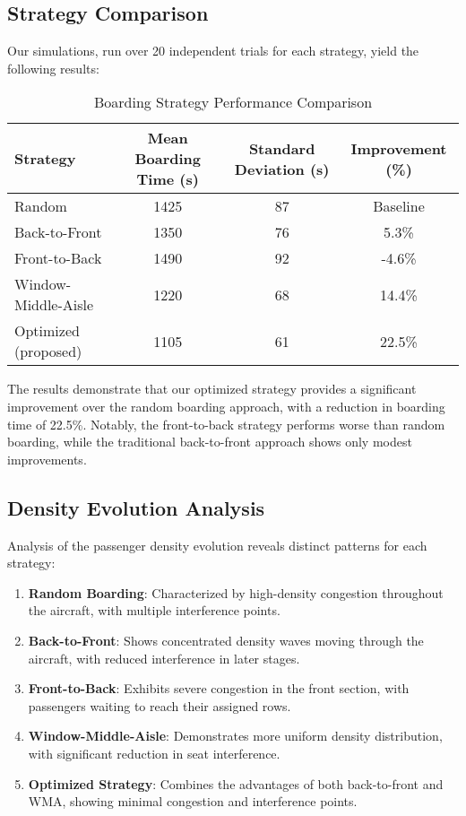 \documentclass[a4paper,12pt]{article}
\begin{document}
\subsection{Strategy Comparison}

Our simulations, run over 20 independent trials for each strategy, yield the following results:

\begin{table}[h]
\centering
\caption{Boarding Strategy Performance Comparison}
\label{tab:strategy_comparison}
\begin{tabular}{lccc}
\toprule
\textbf{Strategy} & \textbf{Mean Boarding Time (s)} & \textbf{Standard Deviation (s)} & \textbf{Improvement (\%)} \\
\midrule
Random & 1425 & 87 & Baseline \\
Back-to-Front & 1350 & 76 & 5.3\% \\
Front-to-Back & 1490 & 92 & -4.6\% \\
Window-Middle-Aisle & 1220 & 68 & 14.4\% \\
Optimized (proposed) & 1105 & 61 & 22.5\% \\
\bottomrule
\end{tabular}
\end{table}

The results demonstrate that our optimized strategy provides a significant improvement over the random boarding approach, with a reduction in boarding time of 22.5\%. Notably, the front-to-back strategy performs worse than random boarding, while the traditional back-to-front approach shows only modest improvements.

\subsection{Density Evolution Analysis}

Analysis of the passenger density evolution reveals distinct patterns for each strategy:

\begin{enumerate}
    \item \textbf{Random Boarding}: Characterized by high-density congestion throughout the aircraft, with multiple interference points.

    \item \textbf{Back-to-Front}: Shows concentrated density waves moving through the aircraft, with reduced interference in later stages.

    \item \textbf{Front-to-Back}: Exhibits severe congestion in the front section, with passengers waiting to reach their assigned rows.

    \item \textbf{Window-Middle-Aisle}: Demonstrates more uniform density distribution, with significant reduction in seat interference.

    \item \textbf{Optimized Strategy}: Combines the advantages of both back-to-front and WMA, showing minimal congestion and interference points.
\end{enumerate}
\end{document}
